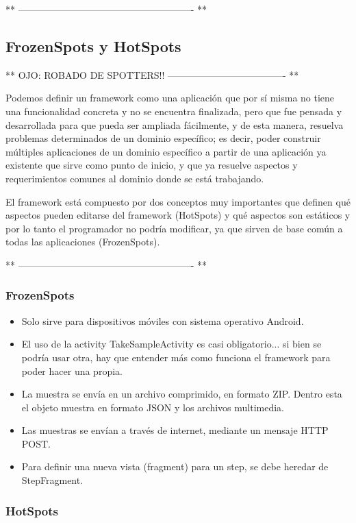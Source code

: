 ** ------------------------------------------------------- **


\subsection{FrozenSpots y HotSpots}
** OJO: ROBADO DE SPOTTERS!! ------------------------------------- **

Podemos definir un framework como una aplicación que por sí misma no tiene una funcionalidad concreta y no se encuentra finalizada, pero que fue pensada y desarrollada para que pueda ser ampliada fácilmente, y de esta manera, resuelva problemas determinados de un dominio específico; es decir, poder construir múltiples aplicaciones de un dominio específico a partir de una aplicación ya existente que sirve como punto de inicio, y que ya resuelve aspectos y requerimientos comunes al dominio donde se está trabajando.

El framework está compuesto por dos conceptos muy importantes que definen qué aspectos pueden editarse del framework (HotSpots) y qué aspectos son estáticos y por lo tanto el programador no podría modificar, ya que sirven de base común a todas las aplicaciones (FrozenSpots).

** ------------------------------------------------------- **

\subsubsection{FrozenSpots}

\begin{itemize}
	\item Solo sirve para dispositivos móviles con sistema operativo Android.
	\item El uso de la activity TakeSampleActivity es casi obligatorio... si bien se podría usar otra, hay que entender más como funciona el framework para poder hacer una propia.
	\item La muestra se envía en un archivo comprimido, en formato ZIP. Dentro esta el objeto muestra en formato JSON y los archivos multimedia.
	\item Las muestras se envían a través de internet, mediante un mensaje HTTP POST.
	\item Para definir una nueva vista (fragment) para un step, se debe heredar de StepFragment.
\end{itemize}

\subsubsection{HotSpots}

